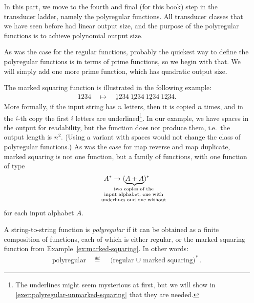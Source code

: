 In this part, we move to the fourth and final (for this book) step in the transducer ladder, namely the  polyregular functions. All transducer classes that we have seen before had linear output size, and the purpose of the polyregular functions is to achieve polynomial output size. 

As was the case for the regular functions, probably the quickest way to define the polyregular functions is in terms of prime functions, so we begin with that. We will simply add one more prime function, which has quadratic output size. 

\begin{myexample}\label{ex:marked-squaring}
    The marked squaring function is illustrated in the following example: 
    \begin{align*}
    1234 \quad \mapsto \quad \underline 1234 \ \underline{12} 34\  \underline{123} 4\  \underline{1234}.
    \end{align*}
    More formally, if the input  string has $n$ letters, then it is copied $n$ times, and in the $i$-th copy the  first $i$ letters are  underlined\footnote{The underlines might seem mysterious at first, but we will show in \cref{exer:polyregular-unmarked-squaring}  that they are needed.}. In our example, we have spaces in the output for readability, but the function does not produce them, i.e.~the output length is $n^2$. (Using a variant with spaces would not change the class of polyregular functions.) As was the case for map reverse and map duplicate, marked squaring is not one function, but a family of functions, with one function of type 
    \begin{align*}
    A^* \to (\myunderbrace{A+A}{two copies of the \\ input alphabet, one with \\ underlines and one without})^*
    \end{align*}
    for each input alphabet $A$.
\end{myexample}


\begin{definition}
    \label{def:polyregular-functions}
    A string-to-string function is  \emph{polyregular} if it can be obtained as a finite composition of functions, each of which is either regular, or the marked squaring function from Example~\ref{ex:marked-squaring}. In other words: 
    \begin{align*}
    \text{polyregular} \quad \eqdef \quad \text{(regular $\cup$ marked squaring)}^*.
    \end{align*}
\end{definition}

